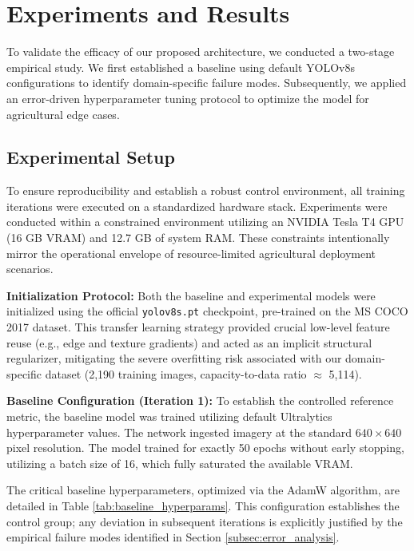 \section{Experiments and Results}
\label{sec:experiments}

To validate the efficacy of our proposed architecture, we conducted a two-stage empirical study. We first established a baseline using default YOLOv8s configurations to identify domain-specific failure modes. Subsequently, we applied an error-driven hyperparameter tuning protocol to optimize the model for agricultural edge cases. 

\subsection{Experimental Setup}
\label{subsec:exp_setup}

To ensure reproducibility and establish a robust control environment, all training iterations were executed on a standardized hardware stack. Experiments were conducted within a constrained environment utilizing an NVIDIA Tesla T4 GPU (16 GB VRAM) and 12.7 GB of system RAM. These constraints intentionally mirror the operational envelope of resource-limited agricultural deployment scenarios.

\textbf{Initialization Protocol:} Both the baseline and experimental models were initialized using the official \texttt{yolov8s.pt} checkpoint, pre-trained on the MS COCO 2017 dataset. This transfer learning strategy provided crucial low-level feature reuse (e.g., edge and texture gradients) and acted as an implicit structural regularizer, mitigating the severe overfitting risk associated with our domain-specific dataset (2,190 training images, capacity-to-data ratio $\approx$ 5,114).

\textbf{Baseline Configuration (Iteration 1):} To establish the controlled reference metric, the baseline model was trained utilizing default Ultralytics hyperparameter values. The network ingested imagery at the standard $640 \times 640$ pixel resolution. The model trained for exactly 50 epochs without early stopping, utilizing a batch size of 16, which fully saturated the available VRAM. 

The critical baseline hyperparameters, optimized via the AdamW algorithm, are detailed in Table \ref{tab:baseline_hyperparams}. This configuration establishes the control group; any deviation in subsequent iterations is explicitly justified by the empirical failure modes identified in Section \ref{subsec:error_analysis}.

